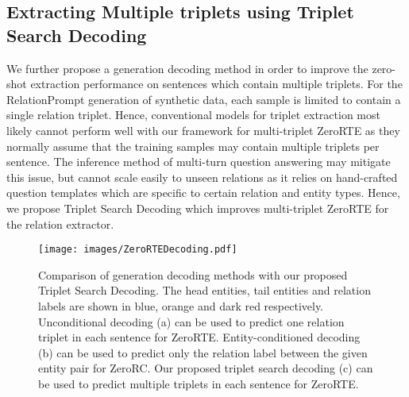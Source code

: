 \documentclass[11pt]{article}
\begin{document}
\subsection{Extracting Multiple triplets using Triplet Search Decoding}
We further propose a generation decoding method in order to improve the zero-shot extraction performance on sentences which contain multiple triplets.
For the RelationPrompt generation of synthetic data, each sample is limited to contain a single relation triplet.
Hence, conventional models for triplet extraction most likely cannot perform well with our framework for multi-triplet ZeroRTE as they normally assume that the training samples may contain multiple triplets per sentence.
The inference method of multi-turn question answering \cite{li2019entity} may mitigate this issue, but cannot scale easily to unseen relations as it relies on hand-crafted question templates which are specific to certain relation and entity types.
Hence, we propose Triplet Search Decoding which improves multi-triplet ZeroRTE for the relation extractor.


\begin{figure}[!t]
\centering
\texttt{[image: images/ZeroRTEDecoding.pdf]}
\caption{
Comparison of generation decoding methods with our proposed Triplet Search Decoding. 
The head entities, tail entities and relation labels are shown in blue, orange and dark red respectively.
Unconditional decoding (a) can be used to predict one relation triplet in each sentence for ZeroRTE. 
Entity-conditioned decoding (b) can be used to predict only the relation label between the given entity pair for ZeroRC.
Our proposed triplet search decoding (c) can be used to predict multiple triplets in each sentence for ZeroRTE.
}
\label{fig:decoding}
\end{figure}
\end{document}
